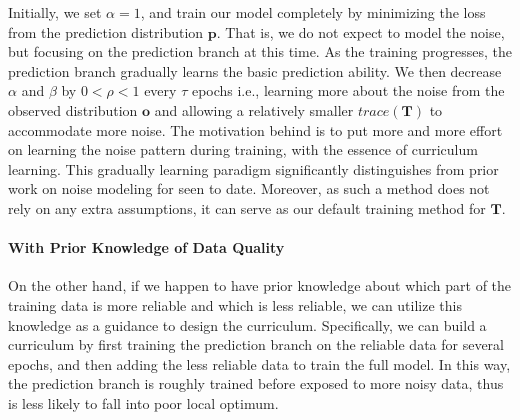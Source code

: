Initially, we set $\alpha=1$, and train our model  completely by minimizing the loss from the prediction distribution $\mathbf{p}$. That is, we do not expect to model the noise,  but focusing  on the prediction branch at this time. As the training progresses, the prediction branch gradually learns the basic prediction ability. We then decrease $\alpha$ and  $\beta$ by $0<\rho<1$  every $\tau$ epochs i.e., learning more about the noise from the observed distribution $\mathbf{o}$ and allowing a relatively smaller $trace(\mathbf{T})$ to accommodate more noise.
The motivation behind is to put more and more effort on learning the noise pattern during training, 
with the essence of curriculum learning.
This gradually learning paradigm significantly distinguishes from prior work on noise modeling for \DS seen to date. 
Moreover, as such a method does not rely on any extra assumptions,
it can serve as our default training method for $\mathbf{T}$.

\paragraph{With Prior Knowledge of Data Quality}
On the other hand, if we happen to have prior knowledge about which part of the training data is more reliable and which is less reliable, we can utilize this knowledge as a guidance to design the curriculum.  
Specifically, we can build a curriculum by first training the prediction branch on the reliable data for several epochs, and then adding the less reliable data to train the full model. In this way, the prediction branch is roughly trained before exposed to more noisy data, thus is less likely to fall into poor local optimum.

